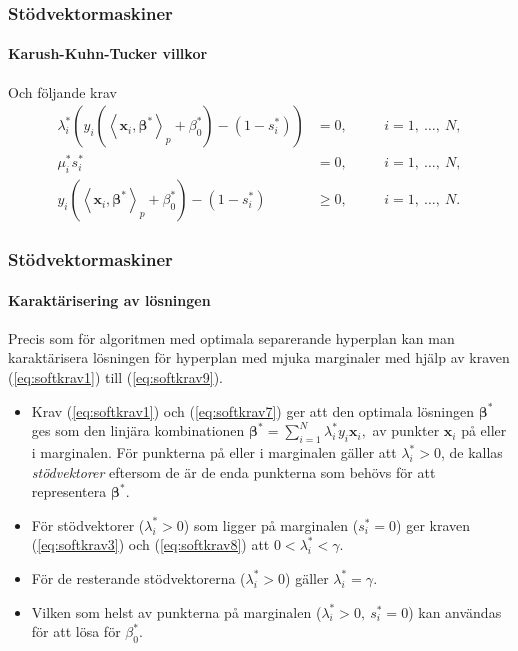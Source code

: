 \documentclass{beamer}
\theoremstyle{definition}
\theoremstyle{remark}
\newcommand{\bfbeta}{{\boldsymbol{\beta}}}
\newcommand{\bfx}{\mathbf{x}}
\newcommand{\llangle}{\left\langle}
\newcommand{\rrangle}{\right\rangle}
\newcommand{\inner}[2]{\llangle #1, #2 \rrangle}
\begin{document}
\begin{frame}
\frametitle{Stödvektormaskiner}
\framesubtitle{Karush-Kuhn-Tucker villkor}
Och följande krav
\begin{align}
\label{eq:softkrav7}	\lambda^*_i\left( y_i\left(\inner{\bfx_i}{\bfbeta^*}_p + \beta^*_0\right) - \left(1-s^*_i\right)\right) &= 0, \quad & &i = 1,~\dots,~N,\\
\label{eq:softkrav8}	\mu^*_is^*_i&=0, \quad & &i = 1,~\dots,~N,\\
\label{eq:softkrav9}	y_i\left(\inner{\bfx_i}{\bfbeta^*}_p+\beta^*_0\right)-\left(1-s^*_i\right) &\geq 0, \quad & &i = 1,~\dots,~N.
\end{align}
\end{frame}

\begin{frame}
\frametitle{Stödvektormaskiner}
\framesubtitle{Karaktärisering av lösningen}
	Precis som för algoritmen med optimala separerande hyperplan kan man karaktärisera lösningen för hyperplan med mjuka marginaler med hjälp av kraven (\ref{eq:softkrav1}) till (\ref{eq:softkrav9}).
	\begin{itemize}
		\item Krav (\ref{eq:softkrav1}) och (\ref{eq:softkrav7}) ger att den optimala lösningen $\bfbeta^*$ ges som den linjära kombinationen
		$\bfbeta^* = \sum_{i=1}^{N}\lambda_i^*y_i\mathbf{x}_i,$
		av punkter $\mathbf{x}_i$ på eller i marginalen. För punkterna på eller i marginalen gäller att $\lambda^*_i>0$, de kallas \emph{stödvektorer} eftersom de är de enda punkterna som behövs för att representera $\bfbeta^*$.
		\item För stödvektorer ($\lambda^*_i>0$) som ligger på marginalen ($s_i^*=0$) ger kraven (\ref{eq:softkrav3}) och (\ref{eq:softkrav8}) att $0<\lambda_i^*<\gamma$.
		\item För de resterande stödvektorerna ($\lambda_i^*>0$) gäller $\lambda_i^*=\gamma$.
		\item Vilken som helst av punkterna på marginalen ($\lambda^*_i>0,~s^*_i=0$) kan användas för att lösa för $\beta_0^*$.
	\end{itemize}
\end{frame}
\end{document}
